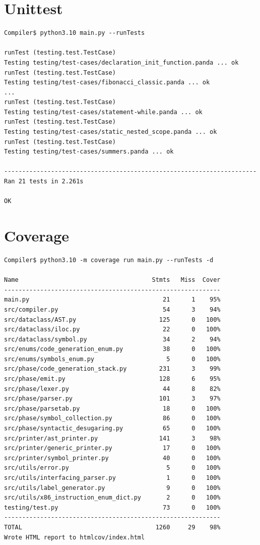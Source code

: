 \section{Unittest}
\begin{verbatim}
Compiler$ python3.10 main.py --runTests

runTest (testing.test.TestCase)
Testing testing/test-cases/declaration_init_function.panda ... ok
runTest (testing.test.TestCase)
Testing testing/test-cases/fibonacci_classic.panda ... ok
...
runTest (testing.test.TestCase)
Testing testing/test-cases/statement-while.panda ... ok
runTest (testing.test.TestCase)
Testing testing/test-cases/static_nested_scope.panda ... ok
runTest (testing.test.TestCase)
Testing testing/test-cases/summers.panda ... ok

----------------------------------------------------------------------
Ran 21 tests in 2.261s

OK 
\end{verbatim}

\newpage

\section{Coverage}
\begin{verbatim}
Compiler$ python3.10 -m coverage run main.py --runTests -d

Name                                     Stmts   Miss  Cover
------------------------------------------------------------
main.py                                     21      1    95%
src/compiler.py                             54      3    94%
src/dataclass/AST.py                       125      0   100%
src/dataclass/iloc.py                       22      0   100%
src/dataclass/symbol.py                     34      2    94%
src/enums/code_generation_enum.py           38      0   100%
src/enums/symbols_enum.py                    5      0   100%
src/phase/code_generation_stack.py         231      3    99%
src/phase/emit.py                          128      6    95%
src/phase/lexer.py                          44      8    82%
src/phase/parser.py                        101      3    97%
src/phase/parsetab.py                       18      0   100%
src/phase/symbol_collection.py              86      0   100%
src/phase/syntactic_desugaring.py           65      0   100%
src/printer/ast_printer.py                 141      3    98%
src/printer/generic_printer.py              17      0   100%
src/printer/symbol_printer.py               40      0   100%
src/utils/error.py                           5      0   100%
src/utils/interfacing_parser.py              1      0   100%
src/utils/label_generator.py                 9      0   100%
src/utils/x86_instruction_enum_dict.py       2      0   100%
testing/test.py                             73      0   100%
------------------------------------------------------------
TOTAL                                     1260     29    98%
Wrote HTML report to htmlcov/index.html
\end{verbatim}

